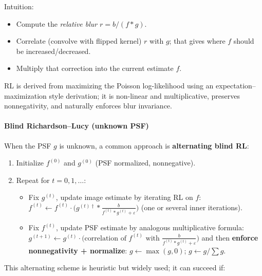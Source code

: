 \documentclass[11pt]{article}
\providecommand{\tightlist}{%
      \setlength{\itemsep}{0pt}\setlength{\parskip}{0pt}}
\begin{document}
Intuition:

\begin{itemize}
\tightlist
\item
  Compute the \emph{relative blur} \(r = b / (f * g)\).
\item
  Correlate (convolve with flipped kernel) \(r\) with \(g\); that gives
  where \(f\) should be increased/decreased.
\item
  Multiply that correction into the current estimate \(f\).
\end{itemize}

RL is derived from maximizing the Poisson log-likelihood using an
expectation--maximization style derivation; it is non-linear and
multiplicative, preserves nonnegativity, and naturally enforces blur
invariance.

\hypertarget{blind-richardsonlucy-unknown-psf}{%
\paragraph{\texorpdfstring{\textbf{Blind Richardson--Lucy (unknown
PSF)}}{Blind Richardson--Lucy (unknown PSF)}}\label{blind-richardsonlucy-unknown-psf}}

When the PSF \(g\) is unknown, a common approach is \textbf{alternating
blind RL}:

\begin{enumerate}
\def\labelenumi{\arabic{enumi}.}
\item
  Initialize \(f^{(0)}\) and \(g^{(0)}\) (PSF normalized, nonnegative).
\item
  Repeat for \(t=0,1,\dots\):

  \begin{itemize}
  \tightlist
  \item
    Fix \(g^{(t)}\), update image estimate by iterating RL on \(f\):
    \(f^{(t)} \leftarrow f^{(t)} \cdot \Big( g^{(t)\dagger} * \frac{b}{f^{(t)} * g^{(t)} + \varepsilon} \Big)\)
    (one or several inner iterations).
  \item
    Fix \(f^{(t)}\), update PSF estimate by analogous multiplicative
    formula:
    \(g^{(t+1)} \leftarrow g^{(t)} \cdot \text{(correlation of $f^{(t)}$ with } \frac{b}{f^{(t)}*g^{(t)}+\varepsilon}\text{)}\)
    and then \textbf{enforce nonnegativity + normalize}:
    \(g\leftarrow \max(g,0)\); \(g\leftarrow g/\sum g\).
  \end{itemize}
\end{enumerate}

This alternating scheme is heuristic but widely used; it can succeed if:
\end{document}
